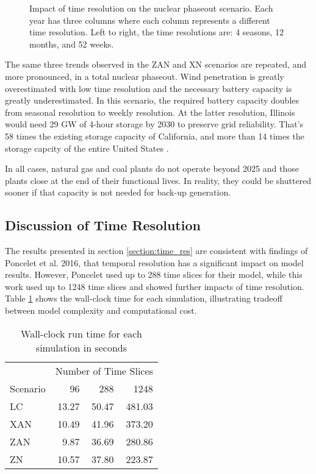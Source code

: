 \begin{figure}[H]
  \centering
  \resizebox{0.95\columnwidth}{!}{}
  \caption{Impact of time resolution on the nuclear phaseout scenario. Each year has three
  columns where each column represents a different time resolution. Left to right, the time
  resolutions are: 4 seasons, 12 months, and 52 weeks.}
  \label{fig:time_res_ZN}
\end{figure}

The same three trends observed in the ZAN and XN scenarios are repeated, and
more pronounced, in a total nuclear phaseout. Wind penetration is greatly overestimated
with low time resolution and the necessary battery capacity is greatly underestimated.
In this scenario, the required battery capacity doubles from seasonal resolution to
weekly resolution. At the latter resolution, Illinois would need 29 GW of 4-hour
storage by 2030 to preserve grid reliability. That's 58 times the existing storage capacity
of California, and more than 14 times the storage capcity of the entire United States
\cite{hutchins_us_2021}.

In all cases, natural gas and coal plants do not operate beyond 2025
and those plants close at the end of their functional lives. In reality, they could be
shuttered sooner if that capacity is not needed for back-up generation.



\subsection{Discussion of Time Resolution}
The results presented in section \ref{section:time_res} are consistent with findings
of Poncelet et al. 2016, that temporal resolution has a significant impact on model results.
However, Poncelet used up to 288 time slices for their model, while this work used
up to 1248 time slices and showed further impacts of time resolution. Table
\ref{tab:time_res_clock} shows the wall-clock time for each simulation, illustrating
tradeoff between model complexity and computational cost.

\begin{table}[H]
  \centering
  \caption{Wall-clock run time for each simulation in seconds}
  \label{tab:time_res_clock}
  \begin{tabular}{l*{3}{r}}
    \toprule
    & \multicolumn{3}{c}{Number of Time Slices}\\
    Scenario & 96 & 288 & 1248\\
    \midrule
    LC &13.27&50.47&481.03\\
    XAN &10.49&41.96&373.20\\
    ZAN &9.87&36.69&280.86\\
    ZN & 10.57&37.80&223.87\\
    \bottomrule
  \end{tabular}
\end{table}


